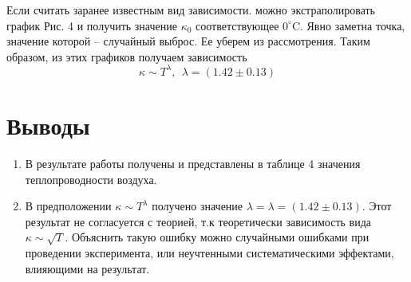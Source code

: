 \documentclass[12pt,a4paper]{scrartcl}
\begin{document}
	Если считать заранее известным вид зависимости. можно экстраполировать график Рис. 4 и получить значение $\kappa_0$ соответствующее $0^\circ$C. Явно заметна точка, значение которой -- случайный выброс. Ее уберем из рассмотрения. Таким образом, из этих графиков получаем зависимость
	$$\kappa \sim T^{\lambda},\ \ \lambda = (1.42 \pm 0.13)$$
	
	
	\section{Выводы}
	\begin{enumerate}
		\item В результате работы получены и представлены в таблице 4 значения теплопроводности воздуха.
		\item В предположении $\kappa \sim T^\lambda$ получено значение $\lambda = \lambda = (1.42 \pm 0.13)$. Этот результат не согласуется с теорией, т.к теоретически зависимость вида $\kappa \sim \sqrt{T}$. Объяснить такую ошибку можно случайными ошибками при проведении эксперимента, или неучтенными систематическими эффектами, влияющими на результат.
	\end{enumerate}
	
\end{document}
